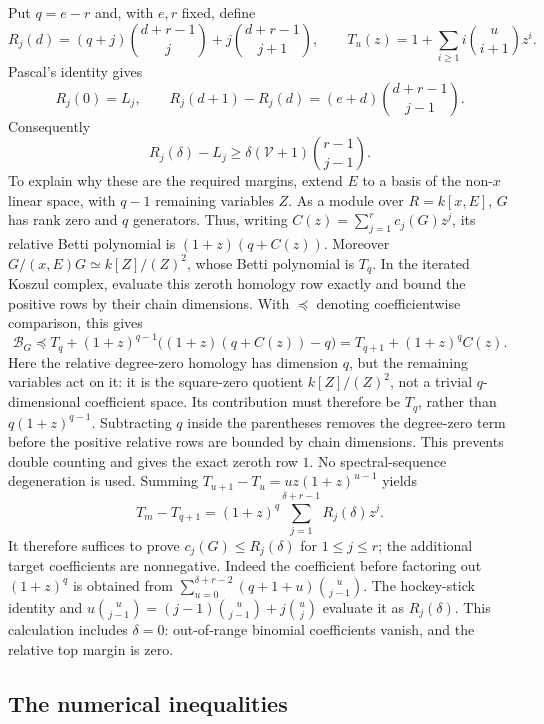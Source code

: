 Put $q=e-r$ and, with $e,r$ fixed, define
\[
 R_j(d)=(q+j)\binom{d+r-1}{j}
          +j\binom{d+r-1}{j+1},\qquad
 T_u(z)=1+\sum_{i\ge1}i\binom u{i+1}z^i.
\]
Pascal's identity gives
\[
 R_j(0)=L_j,\qquad
 R_j(d+1)-R_j(d)=(e+d)\binom{d+r-1}{j-1}.
\]
Consequently
\begin{equation}\label{eq:ordinary-margin}
 R_j(\delta)-L_j\ge
 \delta(\mathcal V+1)\binom{r-1}{j-1}.
\end{equation}
To explain why these are the required margins, extend $E$ to a basis
of the non-$x$ linear space, with $q-1$ remaining variables $Z$.
As a module over $R=k[x,E]$, $G$ has rank zero and $q$ generators.
Thus, writing $C(z)=\sum_{j=1}^rc_j(G)z^j$, its relative Betti polynomial
is $(1+z)(q+C(z))$.  Moreover
$G/(x,E)G\simeq k[Z]/(Z)^2$, whose Betti polynomial is $T_q$.
In the iterated Koszul complex, evaluate this zeroth homology row
exactly and bound the positive rows by their chain dimensions.  With
$\preceq$ denoting coefficientwise comparison, this gives
\begin{equation}\label{eq:ordinary-full-transfer}
 \mathcal B_G\preceq T_q+(1+z)^{q-1}
       \bigl((1+z)(q+C(z))-q\bigr)
       =T_{q+1}+(1+z)^qC(z).
\end{equation}
Here the relative degree-zero homology has dimension $q$, but the
remaining variables act on it: it is the square-zero quotient
$k[Z]/(Z)^2$, not a trivial $q$-dimensional coefficient space. Its
contribution must therefore be $T_q$, rather than
$q(1+z)^{q-1}$. Subtracting $q$ inside the parentheses removes the
degree-zero term before the positive relative rows are bounded by
chain dimensions. This prevents double counting and gives the exact
zeroth row $1$. No spectral-sequence degeneration is used.
Summing $T_{u+1}-T_u=uz(1+z)^{u-1}$ yields
\begin{equation}\label{eq:ordinary-target-difference}
 T_m-T_{q+1}=(1+z)^q
       \sum_{j=1}^{\delta+r-1}R_j(\delta)z^j.
\end{equation}
It therefore suffices to prove $c_j(G)\le R_j(\delta)$ for $1\le j\le r$;
the additional target coefficients are nonnegative.
Indeed the coefficient before factoring out $(1+z)^q$ is obtained from
$\sum_{u=0}^{\delta+r-2}(q+1+u)\binom{u}{j-1}$.
The hockey-stick identity and
$u\binom{u}{j-1}=(j-1)\binom{u}{j-1}+j\binom{u}{j}$ evaluate it as
$R_j(\delta)$.  This calculation includes $\delta=0$: out-of-range
binomial coefficients vanish, and the relative top margin is zero.

\subsection{The numerical inequalities}

